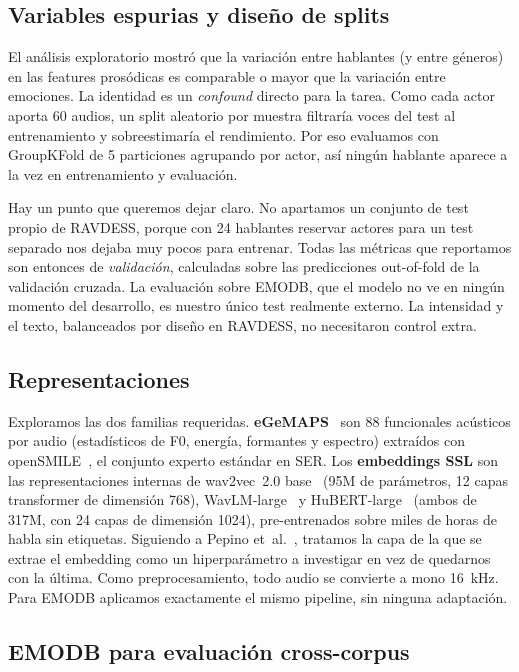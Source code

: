 \documentclass[conference]{IEEEtran}
\begin{document}
\subsection{Variables espurias y diseño de splits}
\label{sec:splits}

El análisis exploratorio mostró que la variación entre hablantes (y entre
géneros) en las features prosódicas es comparable o mayor que la variación
entre emociones. La identidad es un \emph{confound} directo para la tarea.
Como cada actor aporta 60 audios, un split aleatorio por muestra filtraría
voces del test al entrenamiento y sobreestimaría el rendimiento. Por eso
evaluamos con GroupKFold de 5 particiones agrupando por actor, así ningún
hablante aparece a la vez en entrenamiento y evaluación.

Hay un punto que queremos dejar claro. No apartamos un conjunto de test
propio de RAVDESS, porque con 24 hablantes reservar actores para un test
separado nos dejaba muy pocos para entrenar. Todas las métricas que
reportamos son entonces de \emph{validación}, calculadas sobre las
predicciones out-of-fold de la validación cruzada. La evaluación sobre
EMODB, que el modelo no ve en ningún momento del desarrollo, es nuestro
único test realmente externo. La intensidad y el texto, balanceados por
diseño en RAVDESS, no necesitaron control extra.

\subsection{Representaciones}

Exploramos las dos familias requeridas. \textbf{eGeMAPS}~\cite{egemaps} son
88 funcionales acústicos por audio (estadísticos de F0, energía, formantes y
espectro) extraídos con openSMILE~\cite{opensmile}, el conjunto experto
estándar en SER. Los \textbf{embeddings SSL} son las representaciones
internas de wav2vec~2.0 base~\cite{wav2vec2} (95M de parámetros, 12 capas
transformer de dimensión 768), WavLM-large~\cite{wavlm} y
HuBERT-large~\cite{hubert} (ambos de 317M, con 24 capas de dimensión 1024),
pre-entrenados sobre miles de horas de habla sin etiquetas. Siguiendo a
Pepino et~al.~\cite{pepino}, tratamos la capa de la que se extrae el
embedding como un hiperparámetro a investigar en vez de quedarnos con la
última. Como preprocesamiento, todo audio se convierte a mono 16~kHz. Para
EMODB aplicamos exactamente el mismo pipeline, sin ninguna adaptación.

\subsection{EMODB para evaluación cross-corpus}
\end{document}

